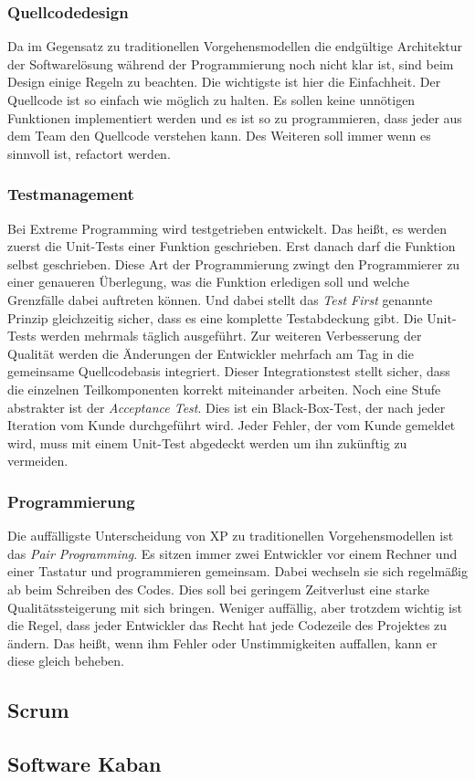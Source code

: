 \subsubsection{Quellcodedesign}
Da im Gegensatz zu traditionellen Vorgehensmodellen die endgültige Architektur der Softwarelösung während der Programmierung noch nicht klar ist, sind beim Design einige Regeln zu beachten. Die wichtigste ist hier die Einfachheit. Der Quellcode ist so einfach wie möglich zu halten. Es sollen keine unnötigen Funktionen implementiert werden und es ist so zu programmieren, dass jeder aus dem Team den Quellcode verstehen kann. Des Weiteren soll immer wenn es sinnvoll ist, refactort werden.

\subsubsection{Testmanagement}
Bei Extreme Programming wird testgetrieben entwickelt. Das heißt, es werden zuerst die Unit-Tests einer Funktion geschrieben. Erst danach darf die Funktion selbst geschrieben. Diese Art der Programmierung zwingt den Programmierer zu einer genaueren Überlegung, was die Funktion erledigen soll und welche Grenzfälle dabei auftreten können. Und dabei stellt das \emph{Test First} genannte Prinzip gleichzeitig sicher, dass es eine komplette Testabdeckung gibt. Die Unit-Tests werden mehrmals täglich ausgeführt. Zur weiteren Verbesserung der Qualität werden die Änderungen der Entwickler mehrfach am Tag in die gemeinsame Quellcodebasis integriert. Dieser Integrationstest stellt sicher, dass die einzelnen Teilkomponenten korrekt miteinander arbeiten. Noch eine Stufe abstrakter ist der \emph{Acceptance Test}. Dies ist ein Black-Box-Test, der nach jeder Iteration vom Kunde durchgeführt wird. Jeder Fehler, der vom Kunde gemeldet wird, muss mit einem Unit-Test abgedeckt werden um ihn zukünftig zu vermeiden.

\subsubsection{Programmierung}
Die auffälligste Unterscheidung von XP zu traditionellen Vorgehensmodellen ist das \emph{Pair Programming}. Es sitzen immer zwei Entwickler vor einem Rechner und einer Tastatur und programmieren gemeinsam. Dabei wechseln sie sich regelmäßig ab beim Schreiben des Codes. Dies soll bei geringem Zeitverlust eine starke Qualitätssteigerung mit sich bringen. Weniger auffällig, aber trotzdem wichtig ist die Regel, dass jeder Entwickler das Recht hat jede Codezeile des Projektes zu ändern. Das heißt, wenn ihm Fehler oder Unstimmigkeiten auffallen, kann er diese gleich beheben. 

\subsection{Scrum}

\subsection{Software Kaban}

